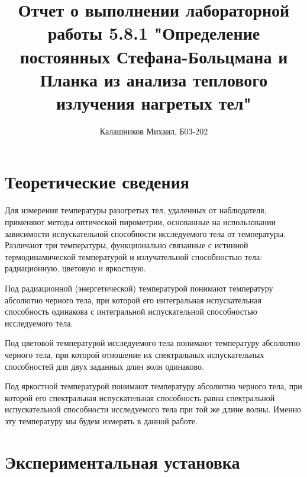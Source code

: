 \documentclass[14pt, a4paper]{report}
\title{\textbf{Отчет о выполнении лабораторной работы 5.8.1 "Определение постоянных Стефана-Больцмана и Планка из анализа теплового излучения нагретых тел"}}
\author{Калашников Михаил, Б03-202}
\date{}
\begin{document}
\maketitle


\section{Теоретические сведения}

Для измерения температуры разогретых тел, удаленных от наблюдателя, применяют методы оптической пирометрии, основанные на использовании зависимости испускательной способности исследуемого тела от температуры. Различают три температуры, функционально связанные с истинной термодинамической температурой и излучательной способностью тела: радиационную, цветовую и яркостную.

Под радиационной (энергетической) температурой понимают температуру абсолютно черного тела, при которой его интегральная испускательная способность одинакова с интегральной испускательной способностью исследуемого тела.

Под цветовой температурой исследуемого тела понимают температуру абсолютно черного тела, при которой отношение их спектральных испускательных способностей для двух заданных длин волн одинаково.

Под яркостной температурой понимают температуру абсолютно черного тела, при которой его спектральная испускательная способность равна спектральной испускательной способности исследуемого тела при той же длине волны. Именно эту температуру мы будем измерять в данной работе.

\section{Экспериментальная установка}
\end{document}
